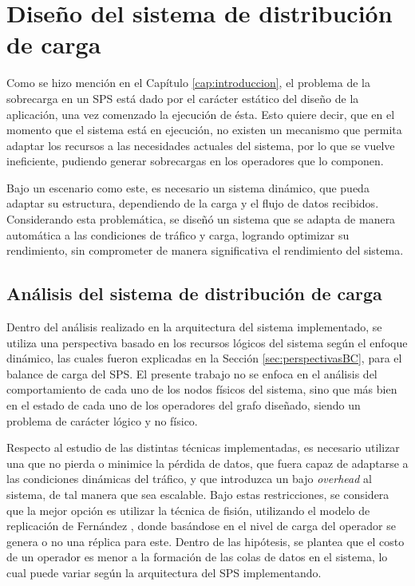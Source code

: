 \chapter{Dise\~no del sistema de distribución de carga}
\label{cap:disenoSistema}


Como se hizo mención en el Capítulo \ref{cap:introduccion}, el problema de la sobrecarga en un SPS está dado por el carácter estático del diseño de la aplicación, una vez comenzado la ejecución de ésta. Esto quiere decir, que en el momento que el sistema está en ejecución, no existen un mecanismo que permita adaptar los recursos a las necesidades actuales del sistema, por lo que se vuelve ineficiente, pudiendo generar sobrecargas en los operadores que lo componen.

Bajo un escenario como este, es necesario un sistema dinámico, que pueda adaptar su estructura, dependiendo de la carga y el flujo de datos recibidos. Considerando esta problemática, se diseñó un sistema que se adapta de manera automática a las condiciones de tráfico y carga, logrando optimizar su rendimiento, sin comprometer de manera significativa el rendimiento del sistema.

\section{Análisis del sistema de distribución de carga}
Dentro del análisis realizado en la arquitectura del sistema implementado, se utiliza una perspectiva basado en los recursos lógicos del sistema según el enfoque dinámico, las cuales fueron explicadas en la Sección \ref{sec:perspectivasBC}, para el balance de carga del SPS. El presente trabajo no se enfoca en el análisis del comportamiento de cada uno de los nodos físicos del sistema, sino que más bien en el estado de cada uno de los operadores del grafo diseñado, siendo un problema de carácter lógico y no físico.

Respecto al estudio de las distintas técnicas implementadas, es necesario utilizar una que no pierda o minimice la pérdida de datos, que fuera capaz de adaptarse a las condiciones dinámicas del tráfico, y que introduzca un bajo \textit{overhead} al sistema, de tal manera que sea escalable. Bajo estas restricciones, se considera que la mejor opción es utilizar la técnica de fisión, utilizando el modelo de replicación de Fernández \citep{FernandezMKP13}, donde basándose en el nivel de carga del operador se genera o no una réplica para este. Dentro de las hipótesis, se plantea que el costo de un operador es menor a la formación de las colas de datos en el sistema, lo cual puede variar según la arquitectura del SPS implementando.

